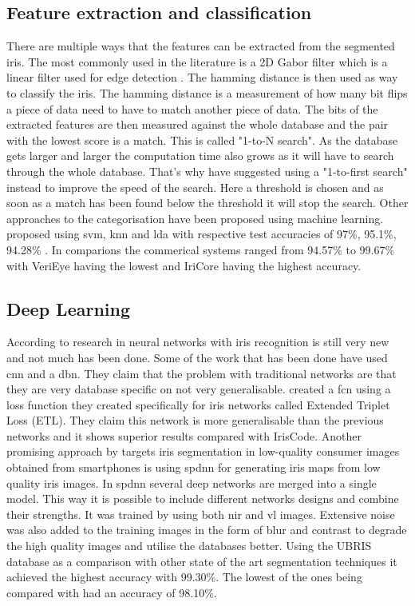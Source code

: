 \subsection{Feature extraction and classification}
There are multiple ways that the features can be extracted from the segmented iris. The most commonly used in the literature is a 2D Gabor filter which is a linear filter used for edge detection \citep{Daugman1993}. The hamming distance is then used as way to classify the iris. The hamming distance is a measurement of how many bit flips a piece of data need to have to match another piece of data. The bits of the extracted features are then measured against the whole database and the pair with the lowest score is a match. This is called "1-to-N search". As the database gets larger and larger the computation time also grows as it will have to search through the whole database. That's why \cite{Kuehlkamp2016} have suggested using a "1-to-first search" instead to improve the speed of the search. Here a threshold is chosen and as soon as a match has been found below the threshold it will stop the search. Other approaches to the categorisation have been proposed using machine learning. \cite{Khan2017} proposed using \gls{svm}, \gls{knn} and \gls{lda} with respective test accuracies of 97\%, 95.1\%, 94.28\% . In comparions the  commerical systems ranged from 94.57\% to  99.67\% with VeriEye having the lowest and IriCore having the highest accuracy. 

\subsection{Deep Learning}
According to \cite{Zhao2017} research in neural networks with iris recognition is still very new and not much has been done. Some of the work that has been done have used \gls{cnn} and a \gls{dbn}. They claim that the problem with traditional networks are that they are very database specific on not very generalisable. \cite{Zhao2017} created a \gls{fcn} using a loss function they created specifically for iris networks called Extended Triplet Loss (ETL). They claim this network is more generalisable than the previous networks and it shows superior results compared with IrisCode. Another promising approach by \citep{Bazrafkan2017} targets iris segmentation in low-quality consumer images obtained from smartphones is using \gls{spdnn} for generating iris maps from low quality iris images.  In \gls{spdnn} several deep networks are merged into a single model. This way it is possible to include different networks designs and combine their strengths. It was trained by using both \gls{nir} and \gls{vl} images. Extensive noise was also added to the training images in the form of blur and contrast to degrade the high quality images and utilise the databases better. Using the UBRIS database as a comparison with other state of the art segmentation techniques it achieved the highest accuracy with 99.30\%. The lowest of the ones being compared with had an accuracy of 98.10\%.   






